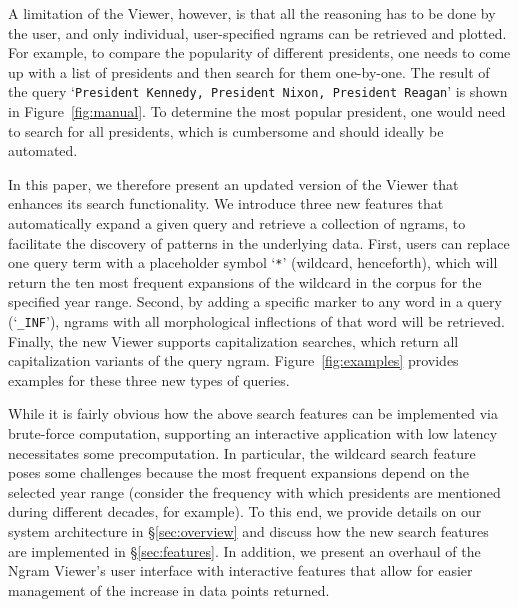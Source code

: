 \documentclass[11pt,a4paper]{article}
\newcommand{\query}[1]{\texttt{#1}}
\begin{document}
A limitation of the Viewer, however, is that all the reasoning has to be done by the user, and only individual, user-specified ngrams can be retrieved and plotted. For example, to compare the popularity of different presidents, one needs to come up with a list of presidents and then search for them one-by-one. The result of the query `\query{President Kennedy, President Nixon, President Reagan}' is shown in Figure~\ref{fig:manual}. To determine the most popular president, one would need to search for all presidents, which is cumbersome and should ideally be automated.



In this paper, we therefore present an updated version of the Viewer that enhances its search functionality. We introduce three new features that automatically expand a given query and retrieve a collection of ngrams, to facilitate the discovery of patterns in the underlying data. First, users can replace one query term with a placeholder symbol `\query{*}' (wildcard, henceforth), which will return the ten most frequent expansions of the wildcard in the corpus for the specified year range. 
Second, by adding a specific marker to any word in a query (`\query{\_INF}'), ngrams with all morphological inflections of that word will be retrieved. 
Finally, the new Viewer supports capitalization searches, which return all capitalization variants of the query ngram. Figure~\ref{fig:examples} provides examples for these three new types of queries.

While it is fairly obvious how the above search features can be implemented via brute-force computation, supporting an interactive application with low latency necessitates some precomputation. In particular, the wildcard search feature poses some challenges because the most frequent expansions depend on the selected year range (consider the frequency with which presidents are mentioned during different decades, for example). To this end, we provide details on our system architecture in \S\ref{sec:overview}  and discuss how the new search features are implemented in \S\ref{sec:features}.
In addition, we present an overhaul of the Ngram Viewer's user interface with interactive features that allow for easier management of the increase in data points returned.
\end{document}
